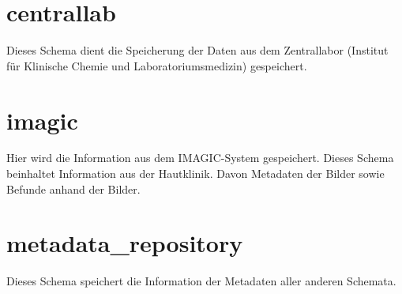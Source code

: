   	\section{centrallab} \label{sc:centrallab}
  Dieses Schema dient die Speicherung der Daten aus dem Zentrallabor (Institut für Klinische Chemie und Laboratoriumsmedizin) gespeichert.

	\section{imagic} \label{sc:imagic}
	Hier wird die Information aus dem IMAGIC-System gespeichert. Dieses Schema beinhaltet Information aus der Hautklinik. Davon Metadaten der Bilder sowie Befunde anhand der Bilder.

	\section{metadata\_repository} \label{sc:metadata}
 	Dieses Schema speichert die Information der Metadaten aller anderen Schemata.
  
